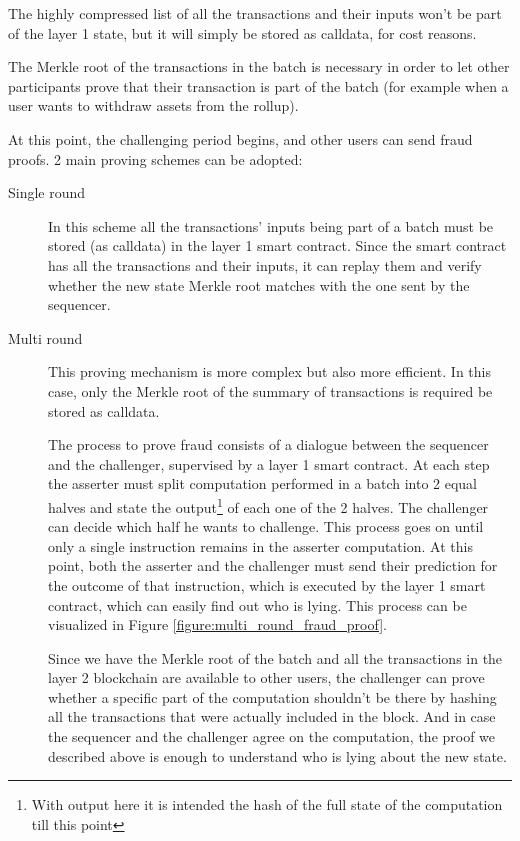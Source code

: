 \documentclass[12pt]{article}
\begin{document}
The highly compressed list of all the transactions and their inputs won't be part of the layer 1 state, but it will simply be stored as calldata, for cost reasons.

The Merkle root of the transactions in the batch is necessary in order to let other participants prove that their transaction is part of the batch (for example when a user wants to withdraw assets from the rollup).

At this point, the challenging period begins, and other users can send fraud proofs. 2 main proving schemes can be adopted:
\begin{description}
    \item[Single round] In this scheme all the transactions' inputs being part of a batch must be stored (as calldata) in the layer 1 smart contract. Since the smart contract has all the transactions and their inputs, it can replay them and verify whether the new state Merkle root matches with the one sent by the sequencer.
    \item[Multi round] This proving mechanism is more complex but also more efficient. In this case, only the Merkle root of the summary of transactions is required be stored as calldata.
                        
                        The process to prove fraud consists of a dialogue between the sequencer and the challenger, supervised by a layer 1 smart contract. At each step the asserter must split computation performed in a batch into 2 equal halves and state the output\footnote{With output here it is intended the hash of the full state of the computation till this point} of each one of the 2 halves. The challenger can decide which half he wants to challenge.
                        This process goes on until only a single instruction remains in the asserter computation. At this point, both the asserter and the challenger must send their prediction for the outcome of that instruction, which is executed by the layer 1 smart contract, which can easily find out who is lying. This process can be visualized in Figure \ref{figure:multi_round_fraud_proof}.

                        Since we have the Merkle root of the batch and all the transactions in the layer 2 blockchain are available to other users, the challenger can prove whether a specific part of the computation shouldn't be there by hashing all the transactions that were actually included in the block. 
                        And in case the sequencer and the challenger agree on the computation, the proof we described above is enough to understand who is lying about the new state.
\end{description}
\end{document}
